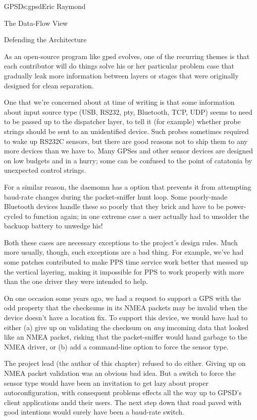 \begin{aosachapter}{GPSD}{s:gpsd}{Eric Raymond}
\begin{aosasect1}{The Data-Flow View}
\end{aosasect1}

\begin{aosasect1}{Defending the Architecture}

As an open-source program like gpsd evolves, one of the recurring
themes is that each contributor will do things solve his or her
particular problem case that gradually leak more information between
layers or stages that were originally designed for clean separation.

One that we're concerned about at time of writing is that some
information about input source type (USB, RS232, pty, Bluetooth, TCP,
UDP) seems to need to be passed up to the dispatcher layer, to tell it
(for example) whether probe strings should be sent to an unidentified
device. Such probes sometimes required to wake up RS232C sensors, but
there are good reasons not to ship them to any more devices than we
have to. Many GPSes and other sensor devices are designed on low
budgets and in a hurry; some can be confused to the point of catatonia
by unexpected control strings.

For a similar reason, the daemomn has a  option that prevents 
it from attempting baud-rate changes  during the packet-sniffer
hunt loop.  Some poorly-made Bluetooth devices handle these so poorly
that they brick and have to be power-cycled to function again; in one
extreme case a user actually had to unsolder the backuop battery to
unwedge his!

Both these cases are necessary exceptions to the project's design
rules.  Much more usually, though, such exceptions are a bad thing.
For example, we've had some patches contributed to make PPS time
service work better that messed up the vertical layering, making it
impossible for PPS to work properly with more than the one driver they
were intended to help.

On one occasion some years ago, we had a request to support a GPS with
the odd property that the checksums in its NMEA packets may be invalid
when the device doesn't have a location fix.  To support this device,
we would have had to either (a) give up on validating the checksum on
\emph{any} imcoming data that looked like an NMEA packet, risking that the
packet-sniffer would hand garbage to the NMEA driver, or (b) add a
command-line option to force the sensor type.

The project lead (the author of this chapter) refused to do either.
Giving up on NMEA packet validation was an obvious bad idea.  But a
switch to force the sensor type would have been an invitation to get
lazy about proper autoconfiguration, with consequent problems effects
all the way up to GPSD's client applications andd their users.  The
next step down that road paved with good intentions would surely have
been a baud-rate switch.


\end{aosasect1}
\end{aosachapter}
